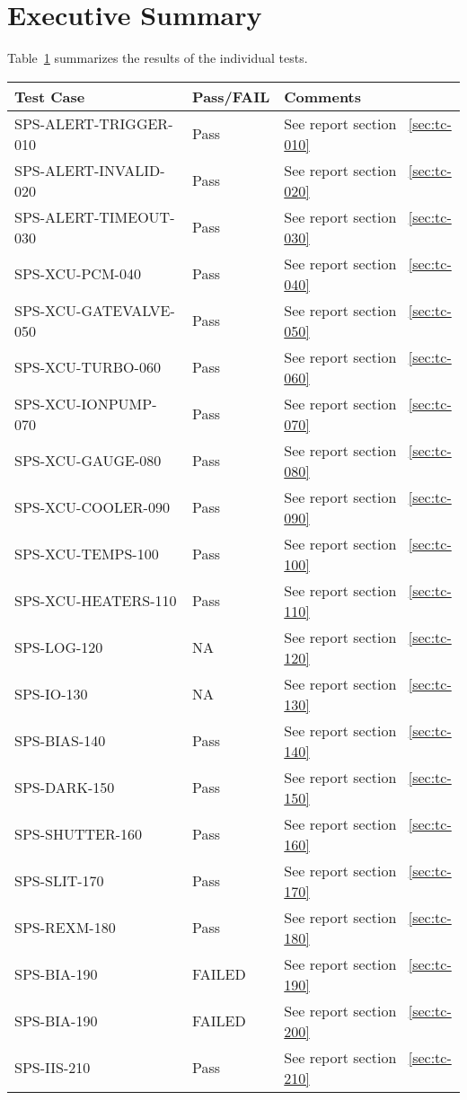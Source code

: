 \section{Executive Summary}

Table~\ref{tab:summary-table} summarizes the results of the individual tests.

\begin{table}[H]
    \begin{tabular}{|p{6cm}|l| p{7cm} | }
    \hline
    {\bf Test Case} & {\bf Pass/FAIL} & {\bf Comments} \\ \hline
    SPS-ALERT-TRIGGER-010 & Pass & See report section ~\ref{sec:tc-010} \\ \hline
    SPS-ALERT-INVALID-020 & Pass & See report section ~\ref{sec:tc-020} \\ \hline
    SPS-ALERT-TIMEOUT-030 & Pass & See report section ~\ref{sec:tc-030} \\ \hline
    SPS-XCU-PCM-040 & Pass & See report section ~\ref{sec:tc-040} \\ \hline
    SPS-XCU-GATEVALVE-050 & Pass & See report section ~\ref{sec:tc-050} \\ \hline
    SPS-XCU-TURBO-060 & Pass & See report section ~\ref{sec:tc-060} \\ \hline
    SPS-XCU-IONPUMP-070 & Pass & See report section ~\ref{sec:tc-070} \\ \hline
    SPS-XCU-GAUGE-080 & Pass & See report section ~\ref{sec:tc-080} \\ \hline
    SPS-XCU-COOLER-090 & Pass & See report section ~\ref{sec:tc-090} \\ \hline
    SPS-XCU-TEMPS-100 & Pass & See report section ~\ref{sec:tc-100} \\ \hline
    SPS-XCU-HEATERS-110 & Pass & See report section ~\ref{sec:tc-110} \\ \hline
    SPS-LOG-120 & NA & See report section ~\ref{sec:tc-120} \\ \hline
    SPS-IO-130 & NA & See report section ~\ref{sec:tc-130} \\ \hline
    SPS-BIAS-140 & Pass & See report section ~\ref{sec:tc-140} \\ \hline
    SPS-DARK-150 & Pass & See report section ~\ref{sec:tc-150} \\ \hline
    SPS-SHUTTER-160 & Pass & See report section ~\ref{sec:tc-160} \\ \hline
    SPS-SLIT-170 & Pass & See report section ~\ref{sec:tc-170} \\ \hline
    SPS-REXM-180 & Pass & See report section ~\ref{sec:tc-180} \\ \hline
    SPS-BIA-190 & FAILED & See report section ~\ref{sec:tc-190} \\ \hline
    SPS-BIA-190 & FAILED & See report section ~\ref{sec:tc-200} \\ \hline
    SPS-IIS-210 & Pass & See report section ~\ref{sec:tc-210} \\ \hline

    \end{tabular}
\label{tab:summary-table}
\end{table}

